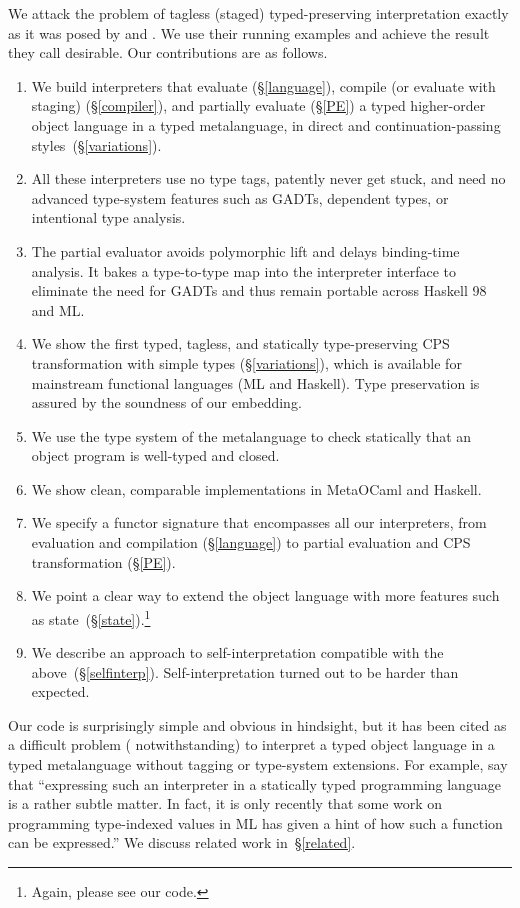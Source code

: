 We attack the problem of tagless (staged) typed-preserving
interpretation exactly as it was posed
by \citet{WalidICFP02} and \citet{xi-guarded}.
We use their running examples and achieve the
result they call desirable.  Our contributions are as follows.

\begin{enumerate}
\item We build interpreters that evaluate (\S\ref{language}),
    compile (or evaluate with staging) (\S\ref{compiler}), and partially evaluate (\S\ref{PE}) a typed higher-order object language
   in a typed metalanguage, in direct and continuation\hyp passing
   styles\ifshort\else\ (\S\ref{variations})\fi.
\item All these interpreters use no type tags, patently never get stuck,
    and need no advanced type-system features such as GADTs, dependent types,
    or intentional type analysis.
\item The partial evaluator avoids polymorphic lift and delays binding-time
    analysis.  It bakes a type-to-type map into the interpreter
    interface to eliminate the need for GADTs and thus remain portable
    across Haskell 98 and ML.
\ifshort\else
\item We show the first typed, tagless, and statically type-preserving CPS
    transformation with simple types (\S\ref{variations}), which is available for mainstream
    functional languages (ML and Haskell). Type preservation is assured by
    the soundness of our embedding.
\fi
\item We use the type system of the metalanguage
    to check statically that an object program is well-typed and closed.
\item We show clean, comparable implementations in MetaOCaml and Haskell.
\item We specify a functor signature that encompasses all our
  interpreters, from evaluation and compilation (\S\ref{language}) 
   to partial evaluation \ifshort\else and CPS transformation \fi(\S\ref{PE}).
\item We point a clear way to extend the object language with more features
    such as state\ifshort\else~(\S\ref{state})\fi.\ifshort\footnote{Again, please see our code.}\fi
\item We describe an approach to self\hyp interpretation compatible with the
  above\ifshort\else~(\S\ref{selfinterp})\fi.  Self\hyp interpretation turned
  out to be harder than expected.\ifshort\footnotemark[\value{footnote}]\fi
\end{enumerate}
Our code is surprisingly simple and obvious in hindsight, but
it has been cited as a difficult problem (\cite{sumii-hybrid}
notwithstanding) to interpret a typed object language in a typed metalanguage
without tagging or type\hyp system extensions.  For example, \citet{taha-tag}
say that ``expressing such an interpreter in a statically typed
programming language is a rather subtle matter. In fact, it is only
recently that some work on programming type-indexed values in ML
\citep{yang-encoding} has given a hint of how such a function can be
expressed.''  We discuss related work in~\S\ref{related}.

